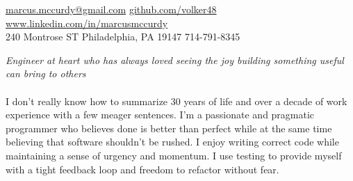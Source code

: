 \documentclass[10pt,a4paper]{article}
\begin{document}
\sloppy  %


\nobreakvspace{0.3em}  %

\noindent\href{mailto:marcus.mccurdy@gmail.com}
{marcus.mccurdy\mbox{}@\mbox{}gmail.com}\sbull
\href{http://github.com/volker48}{github.com/volker48} \sbull
\href{http://www.linkedin.com/in/marcusmccurdy}
    {www.linkedin.com/in/marcusmccurdy}
\\
240 Montrose ST\sbull
Philadelphia, PA 19147 \sbull {}714-791-8345

\spacedhrule{0.9em}{-0.4em}  %


\vspace{-1.3em}  %
\begin{multicols}{2}  %
\noindent \emph{Engineer at heart who has always loved 
seeing the joy building something useful can bring to
others}
\\
\\

I don't really know how to summarize 30 years of life and over a decade of 
work experience with a few meager sentences. I'm a passionate and pragmatic
programmer who believes done is better than perfect while at the same time
believing that software shouldn't be rushed. I enjoy writing correct code
while maintaining a sense of urgency and momentum. I use testing to provide
myself with a tight feedback loop and freedom to refactor without fear.
\end{multicols}


\spacedhrule{0em}{-0.4em}

\end{document}
